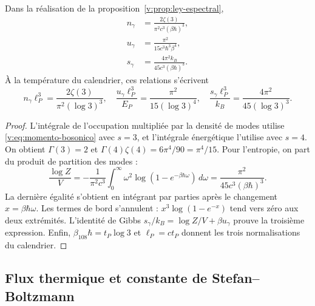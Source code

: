 \begin{proposition}
\label{v:prop:densidades-termicas}
Dans la réalisation de la proposition~\ref{v:prop:ley-espectral},
\begin{align}
 n_\gamma&=\frac{2\zeta(3)}{\pi^2c^3(\beta\hbar)^3},\\
 u_\gamma&=\frac{\pi^2}{15c^3\hbar^3\beta^4},\\
 s_\gamma&=\frac{4\pi^2 k_B}{45c^3(\beta\hbar)^3}.
 \label{v:eq:densidades-termicas}
\end{align}
À la température du calendrier, ces relations s’écrivent
\begin{equation}
 n_\gamma\ell_P^3=\frac{2\zeta(3)}{\pi^2(\log3)^3},\quad
 \frac{u_\gamma\ell_P^3}{E_P}=\frac{\pi^2}{15(\log3)^4},\quad
 \frac{s_\gamma\ell_P^3}{k_B}=\frac{4\pi^2}{45(\log3)^3}.
 \label{v:eq:densidades-calendario}
\end{equation}
\end{proposition}

\begin{proof}
L’intégrale de l’occupation multipliée par la densité de modes utilise
\eqref{v:eq:momento-bosonico} avec \(s=3\), et l’intégrale énergétique
l’utilise avec \(s=4\). On obtient \(\Gamma(3)=2\) et
\(\Gamma(4)\zeta(4)=6\pi^4/90=\pi^4/15\).
Pour l’entropie, on part du produit de partition des modes :
\[
 \frac{\log Z}{V}=-\frac{1}{\pi^2c^3}
 \int_0^\infty\omega^2
 \log(1-e^{-\beta\hbar\omega})\,d\omega
 =\frac{\pi^2}{45c^3(\beta\hbar)^3}.
\]
La dernière égalité s’obtient en intégrant par parties après le changement
\(x=\beta\hbar\omega\). Les termes de bord s’annulent :
\(x^3\log(1-e^{-x})\) tend vers zéro aux deux extrémités.
L’identité de Gibbs \(s_\gamma/k_B=\log Z/V+\beta u_\gamma\)
prouve la troisième expression. Enfin,
\(\beta_{108}\hbar=t_P\log3\) et \(\ell_P=ct_P\) donnent les trois
normalisations du calendrier.
\end{proof}



\subsection{Flux thermique et constante de Stefan--Boltzmann}

